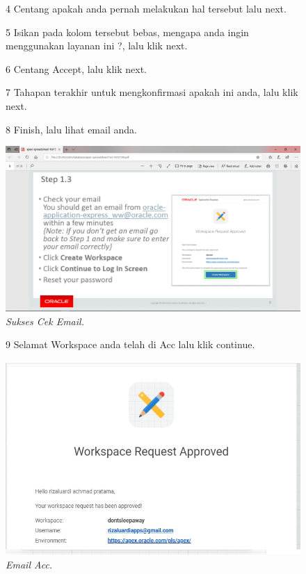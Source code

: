 \begin{enumerate}
\begin{figure}[!htbp]
\item[4]Centang apakah anda pernah melakukan hal tersebut lalu next.  



\item[5]Isikan pada kolom tersebut bebas, mengapa anda ingin menggunakan layanan ini ?, lalu klik next.

    


\item[6] Centang Accept, lalu klik next.

  
\item[7] Tahapan terakhir untuk mengkonfirmasi apakah ini anda, lalu klik next.

   
\item[8] Finish, lalu lihat email anda.

    \begin{center}
\includegraphics[scale=0.2]{figures/pic(3).png}
    \caption{\textit{Sukses Cek Email.}}
        \end{center}
\label{gambar}
\end{figure}

\begin{figure}
\item[9] Selamat Workspace anda telah di Acc lalu klik continue.

    \begin{center}
\includegraphics[scale=0.5]{figures/req7.jpg}
    \caption{\textit{Email Acc.}}
        \end{center}
\label{gambar}
\end{figure}


\end{enumerate}
